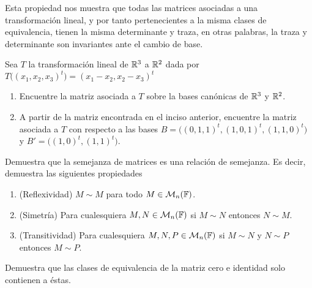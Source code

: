 Esta propiedad nos muestra que todas las matrices asociadas a una transformación lineal, y por tanto pertenecientes a la misma clases de equivalencia, tienen la misma determinante y traza, en otras palabras, la traza y determinante son invariantes ante el cambio de base.


\ExerciseSection

\begin{exerciselist}
  \item Sea $T$ la transformación lineal de $\mathbb{R}^3$ a $\mathbb{R}^2$ dada por $T\bigl((x_1, x_2, x_3)^t\bigr) = (x_1 - x_2, x_2 - x_3)^t$
    \begin{enumerate}
      \item Encuentre la matriz asociada a $T$ sobre la bases canónicas de $\mathbb{R}^3$ y $\mathbb{R}^2$.
      \item A partir de la matriz encontrada en el inciso anterior, encuentre la matriz asociada a $T$ con respecto a las bases $B = \bigl( (0, 1, 1)^t, (1, 0, 1)^t, (1, 1, 0)^t \bigr)$ y $B' = \bigl( (1, 0)^t, (1, 1)^t \bigr)$.
    \end{enumerate}

  \item Demuestra que la semejanza de matrices es una relación de semejanza. Es decir, demuestra las siguientes propiedades
    \begin{enumerate}
      \item (Reflexividad) $M \sim M$ para todo $M \in \mathcal{M}_n(\mathbb{F})$.
      \item (Simetría) Para cualesquiera $M,N \in \mathcal{M}_n(\mathbb{F})$ si $M \sim N$ entonces $N \sim M$.
      \item (Transitividad) Para cualesquiera $M,N,P \in \mathcal{M}_n(\mathbb{F})$ si $M \sim N$ y $N \sim P$ entonces $M \sim P$.
    \end{enumerate}
  
  \item Demuestra que las clases de equivalencia de la matriz cero e identidad solo contienen a éstas.
\end{exerciselist}